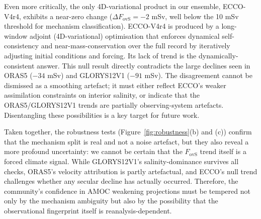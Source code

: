 \documentclass[11pt,a4paper]{article}
\begin{document}
Even more critically, the only 4D-variational product in our ensemble, ECCO-V4r4, exhibits a near-zero change (\(\Delta F_{\mathrm{ovS}} = -2\) mSv, well below the 10 mSv threshold for mechanism classification). ECCO-V4r4 is produced by a long-window adjoint (4D-variational) optimisation that enforces dynamical self-consistency and near-mass-conservation over the full record by iteratively adjusting initial conditions and forcing. Its lack of trend is the dynamically-consistent answer. This null result directly contradicts the large declines seen in ORAS5 (\(-34\) mSv) and GLORYS12V1 (\(-91\) mSv). The disagreement cannot be dismissed as a smoothing artefact; it must either reflect ECCO's weaker assimilation constraints on interior salinity, or indicate that the ORAS5/GLORYS12V1 trends are partially observing-system artefacts. Disentangling these possibilities is a key target for future work.

Taken together, the robustness tests (Figure~\ref{fig:robustness}(b) and (c)) confirm that the mechanism split is real and not a noise artefact, but they also reveal a more profound uncertainty: we cannot be certain that the \(F_{\mathrm{ovS}}\) trend itself is a forced climate signal. While GLORYS12V1's salinity-dominance survives all checks, ORAS5's velocity attribution is partly artefactual, and ECCO's null trend challenges whether any secular decline has actually occurred. Therefore, the community's confidence in AMOC weakening projections must be tempered not only by the mechanism ambiguity but also by the possibility that the observational fingerprint itself is reanalysis-dependent.
\end{document}
